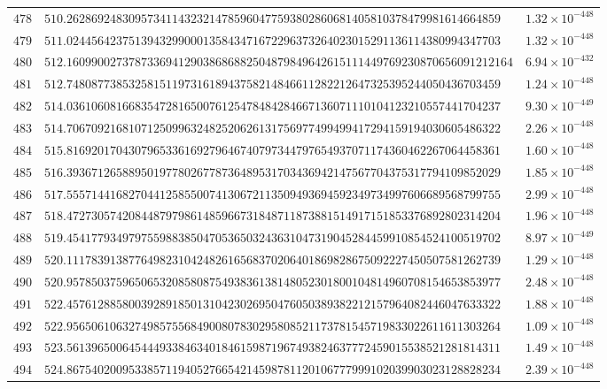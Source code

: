 \documentclass[12pt,reqno]{amsart}
\theoremstyle{remark}
\begin{document}
\begin{longtable}{clc}
$478$ & $510.2628692483095734114323214785960477593802860681405810378479981614664859$ & $1.32\times 10^{-448}$ \\
$479$ & $511.0244564237513943299000135843471672296373264023015291136114380994347703$ & $1.32\times 10^{-448}$ \\
$480$ & $512.160990027378733694129038686882504879849642615111449769230870656091212164$ & $6.94\times 10^{-432}$ \\
$481$ & $512.7480877385325815119731618943758214846611282212647325395244050436703459$ & $1.24\times 10^{-448}$ \\
$482$ & $514.0361060816683547281650076125478484284667136071110104123210557441704237$ & $9.30\times 10^{-449}$ \\
$483$ & $514.7067092168107125099632482520626131756977499499417294159194030605486322$ & $2.26\times 10^{-448}$ \\
$484$ & $515.8169201704307965336169279646740797344797654937071174360462267064458361$ & $1.60\times 10^{-448}$ \\
$485$ & $516.3936712658895019778026778736489531703436942147567704375317794109852029$ & $1.85\times 10^{-448}$ \\
$486$ & $517.5557144168270441258550074130672113509493694592349734997606689568799755$ & $2.99\times 10^{-448}$ \\
$487$ & $518.4727305742084487979861485966731848711873881514917151853376892802314204$ & $1.96\times 10^{-448}$ \\
$488$ & $519.4541779349797559883850470536503243631047319045284459910854524100519702$ & $8.97\times 10^{-449}$ \\
$489$ & $520.1117839138776498231042482616568370206401869828675092227450507581262739$ & $1.29\times 10^{-448}$ \\
$490$ & $520.9578503759650653208580875493836138148052301800104814960708154653853977$ & $2.48\times 10^{-448}$ \\
$491$ & $522.4576128858003928918501310423026950476050389382212157964082446047633322$ & $1.88\times 10^{-448}$ \\
$492$ & $522.9565061063274985755684900807830295808521173781545719833022611611303264$ & $1.09\times 10^{-448}$ \\
$493$ & $523.5613965006454449338463401846159871967493824637772459015538521281814311$ & $1.49\times 10^{-448}$ \\
$494$ & $524.8675402009533857119405276654214598781120106777999102039903023128828234$ & $2.39\times 10^{-448}$ \\

\end{longtable}
\end{document}
